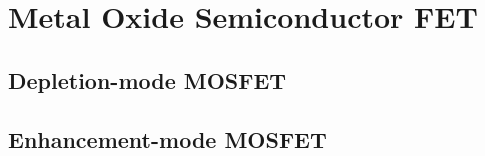 \section{Metal Oxide Semiconductor FET}
\subsection{Depletion-mode MOSFET}
\subsection{Enhancement-mode MOSFET}